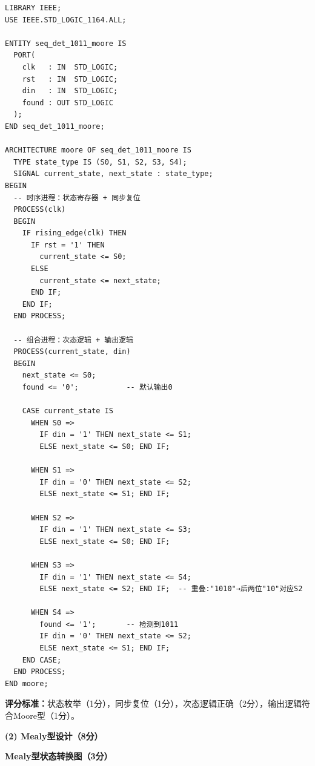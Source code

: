 \begin{lstlisting}[caption={Moore型``1011''序列检测器VHDL代码}]
LIBRARY IEEE;
USE IEEE.STD_LOGIC_1164.ALL;

ENTITY seq_det_1011_moore IS
  PORT(
    clk   : IN  STD_LOGIC;
    rst   : IN  STD_LOGIC;
    din   : IN  STD_LOGIC;
    found : OUT STD_LOGIC
  );
END seq_det_1011_moore;

ARCHITECTURE moore OF seq_det_1011_moore IS
  TYPE state_type IS (S0, S1, S2, S3, S4);
  SIGNAL current_state, next_state : state_type;
BEGIN
  -- 时序进程：状态寄存器 + 同步复位
  PROCESS(clk)
  BEGIN
    IF rising_edge(clk) THEN
      IF rst = '1' THEN
        current_state <= S0;
      ELSE
        current_state <= next_state;
      END IF;
    END IF;
  END PROCESS;

  -- 组合进程：次态逻辑 + 输出逻辑
  PROCESS(current_state, din)
  BEGIN
    next_state <= S0;
    found <= '0';           -- 默认输出0

    CASE current_state IS
      WHEN S0 =>
        IF din = '1' THEN next_state <= S1;
        ELSE next_state <= S0; END IF;

      WHEN S1 =>
        IF din = '0' THEN next_state <= S2;
        ELSE next_state <= S1; END IF;

      WHEN S2 =>
        IF din = '1' THEN next_state <= S3;
        ELSE next_state <= S0; END IF;

      WHEN S3 =>
        IF din = '1' THEN next_state <= S4;
        ELSE next_state <= S2; END IF;  -- 重叠:"1010"→后两位"10"对应S2

      WHEN S4 =>
        found <= '1';       -- 检测到1011
        IF din = '0' THEN next_state <= S2;
        ELSE next_state <= S1; END IF;
    END CASE;
  END PROCESS;
END moore;
\end{lstlisting}

\textbf{评分标准：}状态枚举（1分），同步复位（1分），次态逻辑正确（2分），输出逻辑符合Moore型（1分）。

\vspace{0.3cm}

\textbf{(2) Mealy型设计（8分）}

\textbf{Mealy型状态转换图（3分）}

